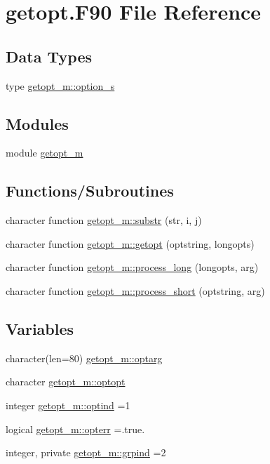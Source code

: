 \hypertarget{getopt_8_f90}{}\section{getopt.\+F90 File Reference}
\label{getopt_8_f90}
\subsection*{Data Types}
\begin{DoxyCompactItemize}
\item 
type \mbox{\hyperlink{structgetopt__m_1_1option__s}{getopt\+\_\+m\+::option\+\_\+s}}
\end{DoxyCompactItemize}
\subsection*{Modules}
\begin{DoxyCompactItemize}
\item 
module \mbox{\hyperlink{namespacegetopt__m}{getopt\+\_\+m}}
\end{DoxyCompactItemize}
\subsection*{Functions/\+Subroutines}
\begin{DoxyCompactItemize}
\item 
character function \mbox{\hyperlink{namespacegetopt__m_ab200fe1febc0e4b17c955268176647e8}{getopt\+\_\+m\+::substr}} (str, i, j)
\item 
character function \mbox{\hyperlink{namespacegetopt__m_a39e6b73629162ef91cda0ccf207643a9}{getopt\+\_\+m\+::getopt}} (optstring, longopts)
\item 
character function \mbox{\hyperlink{namespacegetopt__m_a588c76592ce4cff0901b32c7095ab6bb}{getopt\+\_\+m\+::process\+\_\+long}} (longopts, arg)
\item 
character function \mbox{\hyperlink{namespacegetopt__m_ab9181edeba025c1b397b54536a3fb54d}{getopt\+\_\+m\+::process\+\_\+short}} (optstring, arg)
\end{DoxyCompactItemize}
\subsection*{Variables}
\begin{DoxyCompactItemize}
\item 
character(len=80) \mbox{\hyperlink{namespacegetopt__m_a49ac94befd94285d69af0341beb97638}{getopt\+\_\+m\+::optarg}}
\item 
character \mbox{\hyperlink{namespacegetopt__m_acf231054e6ff3ae54d963696c8c270aa}{getopt\+\_\+m\+::optopt}}
\item 
integer \mbox{\hyperlink{namespacegetopt__m_a41cdbf24b473fe037d94b6311dbeeebc}{getopt\+\_\+m\+::optind}} =1
\item 
logical \mbox{\hyperlink{namespacegetopt__m_a3e4c458844fed95e02a7006113230a6f}{getopt\+\_\+m\+::opterr}} =.true.
\item 
integer, private \mbox{\hyperlink{namespacegetopt__m_a3579bc0473009d7fd52a77dc7df5e6b5}{getopt\+\_\+m\+::grpind}} =2
\end{DoxyCompactItemize}
